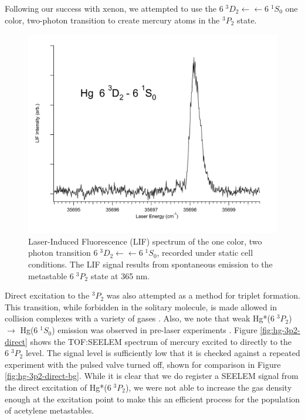 \documentclass[12pt]{mitthesis}
\begin{document}
Following our success with xenon, we attempted to use the $6\;^3D_2
\leftarrow \leftarrow 6\;^1S_0$ one color, two-photon transition to
create mercury atoms in the $^3P_2$ state.

\begin{figure}
  \caption{Laser-Induced Fluorescence (LIF) spectrum of the one color,
    two photon transition  $6\;^3D_2 \leftarrow \leftarrow
    6\;^1S_0$, recorded under static cell conditions.  The LIF signal
    results from spontaneous emission to the metastable $6\;^3P_2$
    state at 365 nm.}
  \label{fig:hg3d2-cell}
  \centering
  \vspace{1cm}
  \includegraphics[width=6in]{Hg3D2-cell.pdf}
  \vspace{1cm}
\end{figure}

Direct excitation to the $^3P_2$ was also attempted as a method for
triplet formation.  This transition, while forbidden in the solitary
molecule, is made allowed in collision complexes with a variety of
gases \cite{kurosawa98, amano98}.  Also, we note that weak Hg*($6 \; ^3P_2$)
$\rightarrow$ Hg($6 \; ^1S_0$) emission was observed in pre-laser
experiments \cite{mrozowski45}.  Figure \ref{fig:hg-3p2-direct} shows
the TOF:SEELEM spectrum of mercury excited to directly to the $6 \;
^3P_2$ level.  The signal level is sufficiently low that it is checked
against a repeated experiment with the pulsed valve turned off, shown
for comparison in Figure \ref{fig:hg-3p2-direct-bg}.  While it is
clear that we do register a SEELEM signal from the direct excitation
of Hg*($6 \; ^3P_2$), we were not able to increase the gas density
enough at the excitation point to make this an efficient process for
the population of acetylene metastables.
\end{document}
